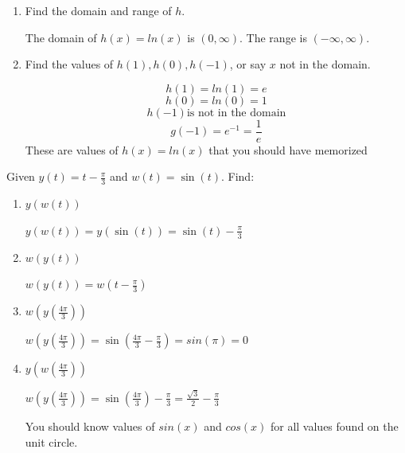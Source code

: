 \documentclass[handout]{ximera}
\begin{document}
\begin{problem}
\begin{enumerate}
	\item Find the domain and range of $h$.
		\begin{freeResponse}
		The domain of $h(x)=ln(x)$ is $(0,\infty)$.  The range is $(-\infty,\infty)$.
		\end{freeResponse}

	\item Find the values of $h(1), h(0), h(-1)$, or say $x$ not in the domain.
			\begin{freeResponse}
			 $$h(1)=ln(1)=e$$
			$$ h(0)=ln(0)=1$$
			$$ h(-1) \text{is not in the domain}$$
			$$g(-1)=e^{-1}=\frac{1}{e}$$
			 These are values of $h(x)=ln(x)$ that you should have memorized

		\end{freeResponse}
	\end{enumerate}
	
 		
		
	
\end{problem}

\begin{instructorNotes}

\end{instructorNotes}



\begin{problem}
Given $y(t)=t- \frac{\pi}{3}$ and $w(t)=\sin(t)$.  Find:
\begin{enumerate}	
	\item  $y(w(t))$
		\begin{freeResponse}
			$y(w(t))=y\left( \sin(t) \right)=\sin(t)-\frac{\pi}{3}$
		\end{freeResponse}	


	\item  $w(y(t))$
		\begin{freeResponse}
		$w(y(t))=w\left( t-\frac{\pi}{3}\right)$
		\end{freeResponse}	


	\item  $w \left(y \left(\frac{4\pi}{3} \right)\right)$
		\begin{freeResponse}
		$w \left(y \left(\frac{4\pi}{3} \right)\right)=\sin \left(\frac{4\pi}{3}-\frac{\pi}{3}\right)=sin(\pi)=0$
		\end{freeResponse}	


	\item  $y(w(\frac{4\pi}{3}))$
		\begin{freeResponse}
		$w \left(y \left(\frac{4\pi}{3} \right)\right)=\sin \left(\frac{4\pi}{3}\right)-\frac{\pi}{3}=\frac{\sqrt{3}}{2}-\frac{\pi}{3}$

		You should know values of $sin(x)$ and $cos(x)$ for all values found on the unit circle.
		\end{freeResponse}	
	
	\end{enumerate}
	
	
\end{problem}
\end{document}
